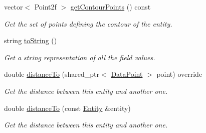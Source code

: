 \begin{DoxyCompactItemize}
vector$<$ Point2f $>$ \hyperlink{classmultiscale_1_1analysis_1_1Entity_a8cc2809f7eb42747727b70049b7af3a3}{get\-Contour\-Points} () const 
\begin{DoxyCompactList}\small\item\em Get the set of points defining the contour of the entity. \end{DoxyCompactList}\item 
string \hyperlink{classmultiscale_1_1analysis_1_1Entity_aedae50d85d369b0e68fa6433d7e3fec6}{to\-String} ()
\begin{DoxyCompactList}\small\item\em Get a string representation of all the field values. \end{DoxyCompactList}\item 
double \hyperlink{classmultiscale_1_1analysis_1_1Entity_a39cb4bb856c295c82676085d976d58e8}{distance\-To} (shared\-\_\-ptr$<$ \hyperlink{classmultiscale_1_1analysis_1_1DataPoint}{Data\-Point} $>$ point) override
\begin{DoxyCompactList}\small\item\em Get the distance between this entity and another one. \end{DoxyCompactList}\item 
double \hyperlink{classmultiscale_1_1analysis_1_1Entity_a9c3eb0f38038fe3bd0b7680c62577a64}{distance\-To} (const \hyperlink{classmultiscale_1_1analysis_1_1Entity}{Entity} \&entity)
\begin{DoxyCompactList}\small\item\em Get the distance between this entity and another one. \end{DoxyCompactList}\end{DoxyCompactItemize}
